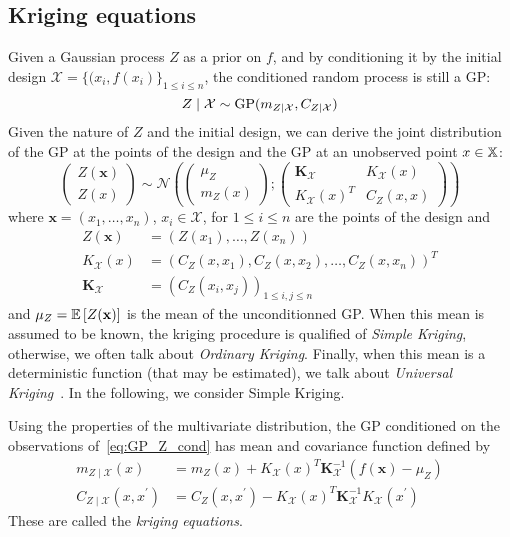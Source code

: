 \documentclass[../../Main_ManuscritThese.tex]{subfiles}
\begin{document}
\subsection{Kriging equations}
\label{sec:krigin_equations}
Given a Gaussian process $Z$ as a prior on $f$, and by conditioning it by the initial design $\mathcal{X} = \{(x_i, f(x_i)\}_{1 \leq i \leq n}$, the conditioned random process is still a GP:
\begin{equation}
  \label{eq:GP_Z_cond}
  Z \mid \mathcal{X} \sim \operatorname{\mathrm{GP}}(m_{Z\mid \mathcal{X}}, C_{Z\mid \mathcal{X}})
\end{equation}
Given the nature of $Z$ and the initial design, we can derive the
joint distribution of the GP at the points of the design and the GP at
an unobserved point $x \in \mathbb{X}$:
\begin{equation}
  \label{eq:GP_joint_distrib}
  \begin{pmatrix}
    Z(\mathbf{x}) \\
    Z(x)
  \end{pmatrix} \sim
  \mathcal{N}\left(
    \begin{pmatrix}
      \mu_Z \\
      m_{Z}(x)
    \end{pmatrix} ;
    \begin{pmatrix}
      \mathbf{K}_{\mathcal{X}} & K_{\mathcal{X}}(x) \\
       K_{\mathcal{X}}(x)^T & C_Z(x, x)
    \end{pmatrix}
\right)
\end{equation}
where $\mathbf{x} = (x_1,\dots,x_n)$, $x_i\in\mathcal{X}$, for $ 1\leq i\leq n$ are the points of the design and
\begin{align}
   Z(\mathbf{x}) &= (Z({x}_1),\dots,Z({x}_n)) \\
  K_{\mathcal{X}}(x) &= \left(C_Z(x, x_1),C_Z(x, x_2),\dots,C_Z(x,x_n)\right)^T \\
  \mathbf{K}_{\mathcal{X}} &= \left(C_Z(x_i, x_j)\right)_{1 \leq i,j \leq n}
\end{align}
and $\mu_Z = \mathbb{E}\left[Z(\mathbf{x})\right]$ is the mean of the
unconditionned GP. When this mean is assumed to be known, the kriging
procedure is qualified of \emph{Simple Kriging}, otherwise, we often
talk about \emph{Ordinary Kriging}. Finally, when this mean is a
deterministic function (that may be estimated), we talk about
\emph{Universal Kriging}~\citep{le_riche_introduction_2014}. In the
following, we consider Simple Kriging.

Using the properties of the multivariate distribution, the GP
conditioned on the observations of~\eqref{eq:GP_Z_cond} has mean and
covariance function defined by
\begin{align}
  m_{Z \mid \mathcal{X}}(x) &= m_Z(x) + K_{\mathcal{X}}(x)^T \mathbf{K}_{\mathcal{X}}^{-1}(f(\mathbf{x}) - \mu_Z ) \\
  C_{Z\mid \mathcal{X}}(x, x^\prime) &= C_Z(x, x^\prime)  - K_{\mathcal{X}}(x)^T\mathbf{K}_{\mathcal{X}}^{-1}K_{\mathcal{X}}(x^\prime)
\end{align}
These are called the \emph{kriging equations}.
\end{document}
